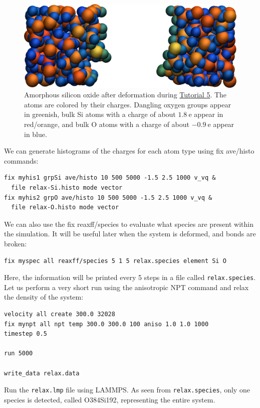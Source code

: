 \documentclass[9pt,tutorial]{livecoms}
\newcommand{\lmpcmd}[1]{\hspace{0pt}\colorbox{listing}{\textcolor{command}{\small{#1}}}\hspace{0pt}} %
\newcommand{\flecmd}[1]{\textcolor{command}{\texttt{#1}}} %
\begin{document}
\begin{figure}
\includegraphics[width=\linewidth]{SIO-deformed}
\caption{Amorphous silicon oxide after deformation during
\hyperref[reactive-silicon-dioxide-label]{Tutorial 5}.  The atoms are colored by their
charges.  Dangling oxygen groups appear in greenish, bulk Si atoms with a charge of
about $1.8~\text{e}$  appear in red/orange, and bulk O atoms with a charge of
about $-0.9 ~ \text{e}$ appear in blue.}
\label{fig:SIO-deformed}
\end{figure}

We can generate histograms of the charges for each atom type using
\lmpcmd{fix ave/histo} commands:
\begin{lstlisting}
fix myhis1 grpSi ave/histo 10 500 5000 -1.5 2.5 1000 v_vq &
  file relax-Si.histo mode vector
fix myhis2 grpO ave/histo 10 500 5000 -1.5 2.5 1000 v_vq &
  file relax-O.histo mode vector
\end{lstlisting}
We can also use the \lmpcmd{fix reaxff/species} to evaluate what species are
present within the simulation.  It will be useful later when the system is deformed,
and bonds are broken:
\begin{lstlisting}
fix myspec all reaxff/species 5 1 5 relax.species element Si O
\end{lstlisting}
Here, the information will be printed every 5 steps in a file called \flecmd{relax.species}.
Let us perform a very short run using the anisotropic NPT command and relax the
density of the system:
\begin{lstlisting}
velocity all create 300.0 32028
fix mynpt all npt temp 300.0 300.0 100 aniso 1.0 1.0 1000
timestep 0.5

run 5000

write_data relax.data
\end{lstlisting}
Run the \flecmd{relax.lmp} file using LAMMPS.  As seen from \flecmd{relax.species},
only one species is detected, called \lmpcmd{O384Si192}, representing the entire system.
\end{document}
